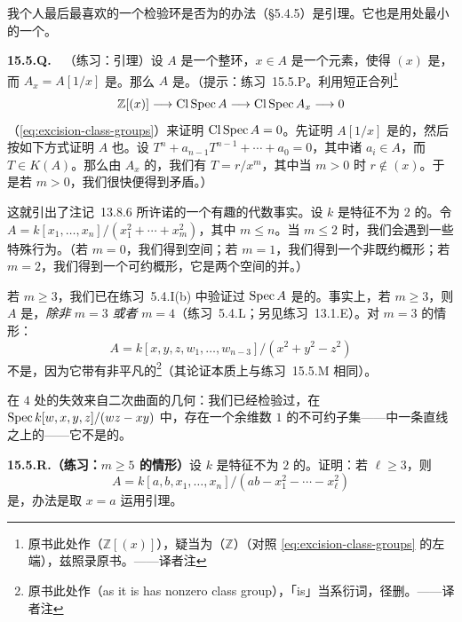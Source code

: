 我个人最后最喜欢的一个检验环是否为\trUFD{}的办法（\S5.4.5）是\trNagata{}引理。它也是用处最小的一个。

\textbf{15.5.Q.}\ \extrahard\ （练习：\trNagata{}引理）\quad 设 $A$ 是一个\trNoetherian{}整环，$x\in A$ 是一个元素，使得 $(x)$ 是\trPrimeIdeal，而 $A_x=A[1/x]$ 是\trUFD。那么 $A$ 是\trUFD。（提示：\mbox{练习~15.5.P}。利用短正合列\footnote{原书此处作（$\mathbb{Z}[(x)]$），疑当为（$\mathbb{Z}$）（对照 \eqref{eq:excision-class-groups} 的左端），兹照录原书。——译者注}
\[
\mathbb{Z}[(x)]\longrightarrow\operatorname{Cl}\operatorname{Spec} A\longrightarrow\operatorname{Cl}\operatorname{Spec} A_x\longrightarrow 0
\]
（\eqref{eq:excision-class-groups}）来证明 $\operatorname{Cl}\operatorname{Spec} A=0$。先证明 $A[1/x]$ 是\trIntegrallyClosed{}的，然后按如下方式证明 $A$ 也\trIntegrallyClosed。设 $T^n+a_{n-1}T^{n-1}+\cdots+a_0=0$，其中诸 $a_i\in A$，而 $T\in K(A)$。那么由 $A_x$ 的\trIntegralClosedness，我们有 $T=r/x^m$，其中当 $m>0$ 时 $r\notin(x)$。于是若 $m>0$，我们很快便得到矛盾。）

这就引出了\mbox{注记~13.8.6} 所许诺的一个有趣的代数事实。设 $k$ 是特征不为 $2$ 的\trAlgClosedField。令 $A=k[x_1,\dots,x_n]/(x_1^2+\cdots+x_m^2)$，其中 $m\le n$。当 $m\le 2$ 时，我们会遇到一些特殊行为。（若 $m=0$，我们得到\trAffine{}空间；若 $m=1$，我们得到一个非既约概形；若 $m=2$，我们得到一个可约概形，它是两个\trAffine{}空间的并。）

若 $m\ge 3$，我们已在\mbox{练习~5.4.I}(b) 中验证过 $\operatorname{Spec} A$ 是\trNormal{}的。事实上，若 $m\ge 3$，则 $A$ 是\trUFD，\emph{除非} $m=3$ \emph{或者} $m=4$（\mbox{练习~5.4.L}；另见\mbox{练习~13.1.E}）。对 $m=3$ 的情形：
\[
A=k[x,y,z,w_1,\dots,w_{n-3}]/(x^2+y^2-z^2)
\]
不是\trUFD，因为它带有非平凡的\trClassGroup\footnote{原书此处作（as it is has nonzero class group），「is」当系衍词，径删。——译者注}（其论证本质上与\mbox{练习~15.5.M} 相同）。

在 $4$ 处的失效来自二次曲面的几何：我们已经检验过，在 $\operatorname{Spec} k[w,x,y,z]/(wz-xy)$ 中，存在一个余维数 $1$ 的不可约子集——\trRuling{}中一条直线之上的\trCone——它不是\trPrincipal{}的。

\textbf{15.5.R.（练习：$m\ge 5$ 的情形）}\quad 设 $k$ 是特征不为 $2$ 的\trAlgClosedField。证明：若 $\ell\ge 3$，则
\[
A=k[a,b,x_1,\dots,x_n]/(ab-x_1^2-\cdots-x_\ell^2)
\]
是\trUFD，办法是取 $x=a$ 运用\trNagata{}引理。


